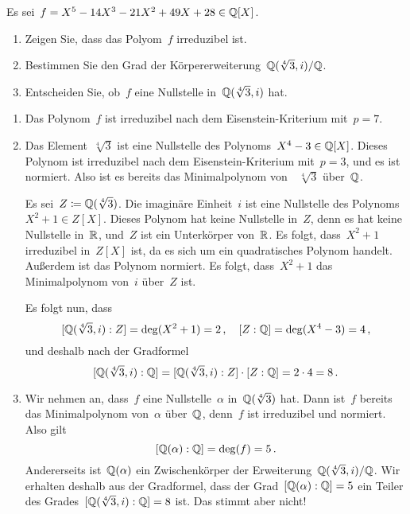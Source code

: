 \documentclass{scrartcl}
\begin{document}
\begin{exercise}[subtitle = {Erstklausur~19/20}]
  Es sei~$f = X^5 - 14 X^3 - 21 X^2 + 49 X + 28 \in \mathbb{Q}[X]$.
  \begin{enumerate}
    \item
      Zeigen Sie, dass das Polyom~$f$ irreduzibel ist.
    \item
      Bestimmen Sie den Grad der Körpererweiterung~$\mathbb{Q}(\sqrt[4]{3}, i) / \mathbb{Q}$.
    \item
      Entscheiden Sie, ob~$f$ eine Nullstelle in~$\mathbb{Q}(\sqrt[4]{3}, i)$ hat.
  \end{enumerate}
\end{exercise}

\begin{solution}
  \begin{enumerate}
    \item
      Das Polynom~$f$ ist irreduzibel nach dem Eisenstein-Kriterium mit~$p = 7$.
    \item
      Das Element~$\sqrt[4]{3}$ ist eine Nullstelle des Polynoms~$X^4 - 3 \in \mathbb{Q}[X]$.
      Dieses Polynom ist irreduzibel nach dem Eisenstein-Kriterium mit~$p = 3$, und es ist normiert.
      Also ist es bereits das Minimalpolynom von~~$\sqrt[4]{3}$ über~$\mathbb{Q}$.

      Es sei~$Z \coloneqq \mathbb{Q}( \sqrt[4]{3} )$.
      Die imaginäre Einheit~$i$ ist eine Nullstelle des Polynoms~$X^2 + 1 \in Z[X]$.
      Dieses Polynom hat keine Nullstelle in~$Z$, denn es hat keine Nullstelle in~$\mathbb{R}$, und~$Z$ ist ein Unterkörper von~$\mathbb{R}$.
      Es folgt, dass~$X^2 + 1$ irreduzibel in~$Z[X]$ ist, da es sich um ein quadratisches Polynom handelt. 
      Außerdem ist das Polynom normiert.
      Es folgt, dass~$X^2 + 1$ das Minimalpolynom von~$i$ über~$Z$ ist.

      Es folgt nun, dass
      \[
        [\mathbb{Q}(\sqrt[4]{3}, i) : Z]
        =
        \deg(X^2 + 1)
        =
        2 \,,
        \quad
        [Z : \mathbb{Q}]
        =
        \deg(X^4 - 3)
        = 4 \,,
      \]
      und deshalb nach der Gradformel
      \[
        [ \mathbb{Q}(\sqrt[4]{3}, i) : \mathbb{Q} ]
        =
        [ \mathbb{Q}(\sqrt[4]{3}, i) : Z ]
        \cdot
        [ Z : \mathbb{Q} ]
        =
        2 \cdot 4
        =
        8 \,.
      \]
    \item
      Wir nehmen an, dass~$f$ eine Nullstelle~$\alpha$ in~$\mathbb{Q}(\sqrt[4]{3})$ hat.
      Dann ist~$f$ bereits das Minimalpolynom von~$\alpha$ über~$\mathbb{Q}$, denn~$f$ ist irreduzibel und normiert.
      Also gilt
      \[
        [\mathbb{Q}(\alpha) : \mathbb{Q}]
        =
        \deg(f)
        =
        5 \,.
      \]
      Andererseits ist~$\mathbb{Q}(\alpha)$ ein Zwischenkörper der Erweiterung~$\mathbb{Q}(\sqrt[4]{3}, i) / \mathbb{Q}$.
      Wir erhalten deshalb aus der Gradformel, dass der Grad~$[\mathbb{Q}(\alpha) : \mathbb{Q}] = 5$ ein Teiler des Grades~$[\mathbb{Q}(\sqrt[4]{3}, i) : \mathbb{Q}] = 8$ ist.
      Das stimmt aber nicht!
  \end{enumerate}
\end{solution}
\end{document}
